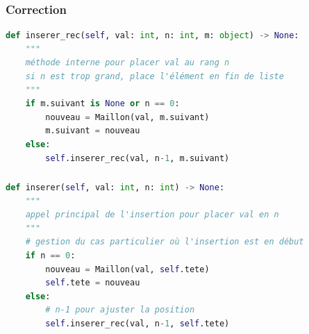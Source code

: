 \documentclass[svgnames,11pt]{beamer}
\begin{document}
\begin{frame}[fragile]
    \frametitle{Correction}

\begin{center}
\begin{lstlisting}[language=Python , basicstyle=\ttfamily\small, xleftmargin=2em, xrightmargin=2em]
def inserer_rec(self, val: int, n: int, m: object) -> None:
    """
    méthode interne pour placer val au rang n
    si n est trop grand, place l'élément en fin de liste
    """
    if m.suivant is None or n == 0:
        nouveau = Maillon(val, m.suivant)
        m.suivant = nouveau
    else:
        self.inserer_rec(val, n-1, m.suivant)
\end{lstlisting}
\end{center}

\end{frame}
\begin{frame}[fragile]
    \frametitle{}

\begin{center}
\begin{lstlisting}[language=Python , basicstyle=\ttfamily\small, xleftmargin=2em, xrightmargin=2em]
def inserer(self, val: int, n: int) -> None:
    """
    appel principal de l'insertion pour placer val en n
    """
    # gestion du cas particulier où l'insertion est en début
    if n == 0:
        nouveau = Maillon(val, self.tete)
        self.tete = nouveau
    else:
        # n-1 pour ajuster la position
        self.inserer_rec(val, n-1, self.tete)
\end{lstlisting}
\end{center}

\end{frame}
\end{document}
